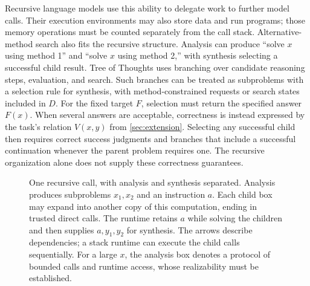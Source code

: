 \documentclass[11pt,twoside]{article}
\theoremstyle{definition}
\theoremstyle{remark}
\begin{document}
Recursive language models use this ability to delegate work to further
model calls. Their execution environments may also store data and run
programs; those memory operations must be counted separately from the call
stack. Alternative-method search also fits the recursive structure.
Analysis can produce ``solve $x$ using method 1'' and ``solve $x$ using
method 2,'' with synthesis selecting a successful child result. Tree of
Thoughts uses branching over candidate reasoning steps, evaluation, and
search. Such branches can be treated as subproblems with a selection rule
for synthesis, with method-constrained requests or search states included
in $D$. For the fixed target $F$, selection must return the specified
answer $F(x)$. When several answers are acceptable, correctness is instead
expressed by the task's relation $V(x,y)$ from \cref{sec:extension}.
Selecting any successful child then requires correct success judgments
and branches that include a successful continuation whenever the parent
problem requires one. The recursive organization alone does not supply
these correctness guarantees.

\begin{figure}[htbp]
\centering
{}
\caption{One recursive call, with analysis and synthesis separated.
Analysis produces subproblems $x_1,x_2$ and an instruction $a$. Each child
box may expand into another copy of this computation, ending in trusted
direct calls. The runtime retains $a$ while solving the children and then
supplies $a,y_1,y_2$ for synthesis. The arrows describe dependencies; a
stack runtime can execute the child calls sequentially. For a large $x$,
the analysis box denotes a protocol of bounded calls and runtime access,
whose realizability must be established.}
\label{fig:analysis-tree}
\end{figure}
\end{document}
